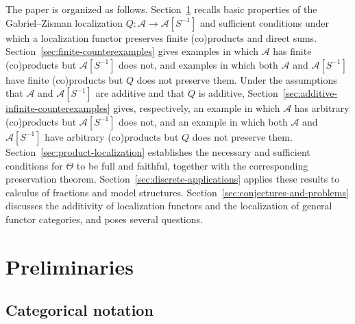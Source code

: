 \documentclass[10pt,a4paper]{amsart}
\theoremstyle{plain}
\theoremstyle{definition}
\theoremstyle{remark}
\begin{document}
\medskip

The paper is organized as follows.
Section~\ref{sec:preliminaries} recalls basic properties of the Gabriel--Zisman localization $Q : \mathcal{A} \longrightarrow \mathcal{A}[S^{-1}]$ and sufficient conditions under which a localization functor preserves finite (co)products and direct sums.
Section~\ref{sec:finite-counterexamples} gives examples in which $\mathcal{A}$ has finite (co)products but $\mathcal{A}[S^{-1}]$ does not, and examples in which both $\mathcal{A}$ and $\mathcal{A}[S^{-1}]$ have finite (co)products but $Q$ does not preserve them.
Under the assumptions that $\mathcal{A}$ and $\mathcal{A}[S^{-1}]$ are additive and that $Q$ is additive, Section~\ref{sec:additive-infinite-counterexamples} gives, respectively, an example in which $\mathcal{A}$ has arbitrary (co)products but $\mathcal{A}[S^{-1}]$ does not, and an example in which both $\mathcal{A}$ and $\mathcal{A}[S^{-1}]$ have arbitrary (co)products but $Q$ does not preserve them.
Section~\ref{sec:product-localization} establishes the necessary and sufficient conditions for $\Theta$ to be full and faithful, together with the corresponding preservation theorem.
Section~\ref{sec:discrete-applications} applies these results to calculus of fractions and model structures.
Section~\ref{sec:conjectures-and-problems} discusses the additivity of localization functors and the localization of general functor categories, and poses several questions.

\section{Preliminaries}\label{sec:preliminaries}

\subsection{Categorical notation}
\end{document}
